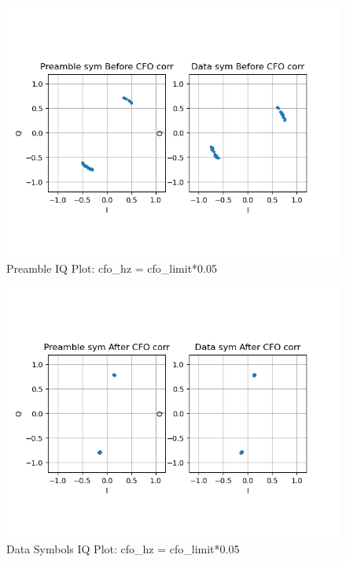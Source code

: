 \documentclass[
	letterpaper, %
	10pt, %
]{CSUniSchoolLabReport}
\begin{document}
\begin{figure}[H] %
	\centering %
	\includegraphics[width=1.2\textwidth]{assignment1b.png} %
	\caption{Preamble IQ Plot: cfo\_hz = cfo\_limit*0.05}
	\label{fig:block}
\end{figure}

\begin{figure}[H] %
	\centering %
	\includegraphics[width=1.2\textwidth]{assignment1c.png} %
	\caption{Data Symbols IQ Plot: cfo\_hz = cfo\_limit*0.05}
	\label{fig:block}
\end{figure}
\end{document}
